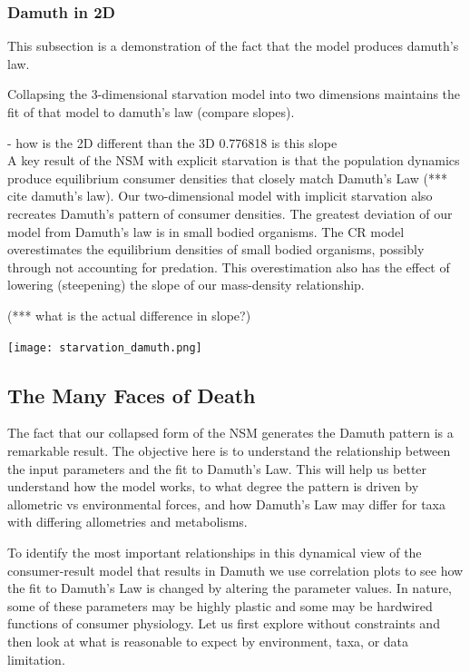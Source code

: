 \documentclass[]{rsos}%
\begin{document}
\subsubsection{Damuth in 2D}

This subsection is a demonstration of the fact that the model produces damuth's law. 

Collapsing the 3-dimensional starvation model into two dimensions maintains the fit of that model to damuth’s law (compare slopes). 

- how is the 2D different than the 3D
0.776818 is this slope\\

A key result of the NSM with explicit starvation is that the population dynamics produce equilibrium consumer densities that closely match Damuth’s Law (*** cite damuth’s law). Our two-dimensional model with implicit starvation also recreates Damuth’s pattern of consumer densities. The greatest deviation of our model from Damuth's law is in small bodied organisms. The CR model overestimates the equilibrium densities of small bodied organisms, possibly through not accounting for predation. This overestimation also has the effect of lowering (steepening) the slope of our mass-density relationship.

(*** what is the actual difference in slope?)


\vspace{0.5cm}

\texttt{[image: starvation\_damuth.png]}

\vspace{0.5cm}








\subsection{The Many Faces of Death}

The fact that our collapsed form of the NSM generates the Damuth pattern is a remarkable result. The objective here is to understand the relationship between the input parameters and the fit to Damuth’s Law. This will help us better understand how the model works, to what degree the pattern is driven by allometric vs environmental forces, and how Damuth's Law may differ for taxa with differing allometries and metabolisms.

To identify the most important relationships in this dynamical view of the consumer-result model that results in Damuth we use correlation plots to see how the fit to Damuth's Law is changed by altering the parameter values. In nature, some of these parameters may be highly plastic and some may be hardwired functions of consumer physiology. Let us first explore without constraints and then look at what is reasonable to expect by environment, taxa, or data limitation. 
\end{document}

